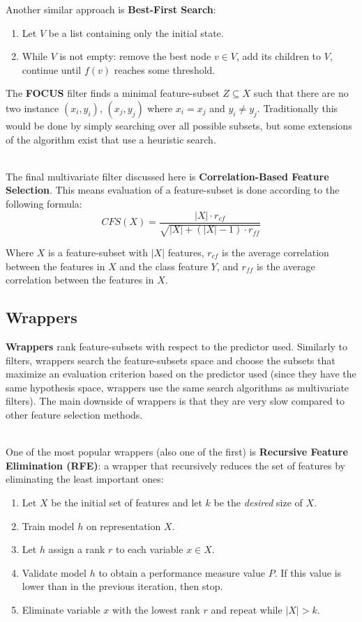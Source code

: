 \documentclass[12pt]{article}
\begin{document}
\noindent
Another similar approach is \textbf{Best-First Search}:

\begin{enumerate}
    \item Let $V$ be a list containing only the initial state.
    \item While $V$ is not empty: remove the best node $v \in V$, add its children to $V$, continue until $f(v)$ reaches some threshold.
\end{enumerate}

\newpage
\noindent
The \textbf{FOCUS} filter finds a minimal feature-subset $Z \subseteq X$ such that there are no two instance $(x_i, y_i)$, $(x_j, y_j)$ where $x_i = x_j$ and $y_i \neq y_j$.
Traditionally this would be done by simply searching over all possible subsets, but some extensions of the algorithm exist that use a heuristic search.

\noindent
\\
The final multivariate filter discussed here is \textbf{Correlation-Based Feature Selection}.
This means evaluation of a feature-subset is done according to the following formula:
\[ CFS(X) = \frac{|X| \cdot r_{cf}}{\sqrt{|X| + (|X| - 1) \cdot r_{ff}}} \]

\noindent
Where $X$ is a feature-subset with $|X|$ features, $r_{cf}$ is the average correlation between the features in $X$ and the class feature $Y$, and $r_{ff}$ is the average correlation between the features in $X$.

\subsection{Wrappers}
\textbf{Wrappers} rank feature-subsets with respect to the predictor used.
Similarly to filters, wrappers search the feature-subsets space and choose the subsets that maximize an evaluation criterion based on the predictor used (since they have the same hypothesis space, wrappers use the same search algorithms as multivariate filters).
The main downside of wrappers is that they are very slow compared to other feature selection methods.

\noindent
\\
One of the most popular wrappers (also one of the first) is \textbf{Recursive Feature Elimination (RFE)}: a wrapper that recursively reduces the set of features by eliminating the least important ones:

\begin{enumerate}
    \item Let $X$ be the initial set of features and let $k$ be the \textit{desired} size of $X$.
    \item Train model $h$ on representation $X$.
    \item Let $h$ assign a rank $r$ to each variable $x \in X$.
    \item Validate model $h$ to obtain a performance measure value $P$. If this value is lower than in the previous iteration, then stop.
    \item Eliminate variable $x$ with the lowest rank $r$ and repeat while $|X| > k$.
\end{enumerate}
\end{document}
